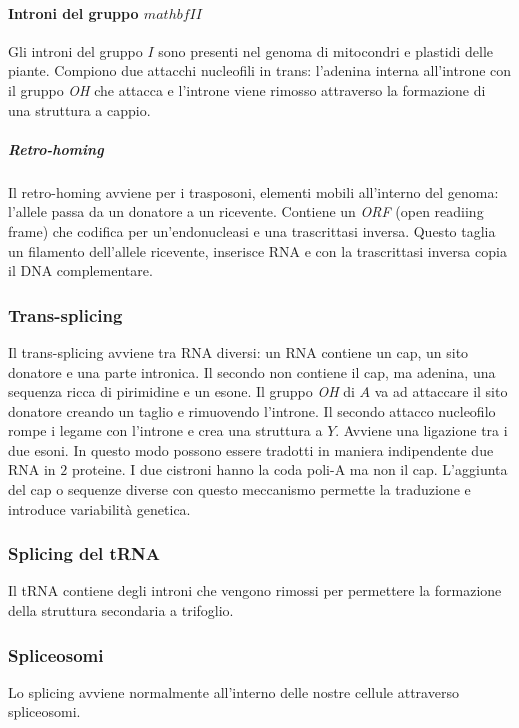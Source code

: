 			\paragraph{Introni del gruppo $mathbf{II}$}
			Gli introni del gruppo $I$ sono presenti nel genoma di mitocondri e plastidi delle piante.
			Compiono due attacchi nucleofili in trans: l'adenina interna all'introne con il gruppo \emph{OH} che attacca e l'introne viene rimosso attraverso la formazione di una struttura a cappio.

				\subparagraph{Retro-homing}
				Il retro-homing avviene per i trasposoni, elementi mobili all'interno del genoma: l'allele passa da un donatore a un ricevente.
				Contiene un \emph{ORF} (open readiing frame) che codifica per un'endonucleasi e una trascrittasi inversa.
				Questo taglia un filamento dell'allele ricevente, inserisce RNA e con la trascrittasi inversa copia il DNA complementare.

		\subsubsection{Trans-splicing}
		Il trans-splicing avviene tra RNA diversi: un RNA contiene un cap, un sito donatore e una parte intronica.
		Il secondo non contiene il cap, ma adenina, una sequenza ricca di pirimidine e un esone.
		Il gruppo \emph{OH} di $A$ va ad attaccare il sito donatore creando un taglio e rimuovendo l'introne.
		Il secondo attacco nucleofilo rompe i legame con l'introne e crea una struttura a $Y$.
		Avviene una ligazione tra i due esoni.
		In questo modo possono essere tradotti in maniera indipendente due RNA in $2$ proteine.
		I due cistroni hanno la coda poli-A ma non il cap.
		L'aggiunta del cap o sequenze diverse con questo meccanismo permette la traduzione e introduce variabilit\`a genetica.

		\subsubsection{Splicing del tRNA}
		Il tRNA contiene degli introni che vengono rimossi per permettere la formazione della struttura secondaria a trifoglio.

		\subsubsection{Spliceosomi}
		Lo splicing avviene normalmente all'interno delle nostre cellule attraverso spliceosomi.
	
